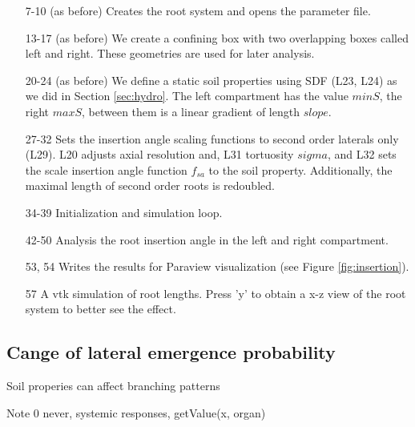 \begin{itemize}

\item[7-10] (as before) Creates the root system and opens the parameter file.

\item[13-17](as before) We create a confining box with two overlapping boxes called left and right. These geometries are used for later analysis.

\item[20-24] (as before) We define a static soil properties using SDF (L23, L24) as we did in Section \ref{sec:hydro}. 
The left compartment has the value $minS$, the right $maxS$, between them is a linear gradient of length $slope$.

\item[27-32] Sets the insertion angle scaling functions to second order laterals only (L29). L20 adjusts axial resolution and, L31 tortuosity $sigma$, and L32 sets the scale insertion angle function $f_{sa}$ to the soil property. Additionally, the maximal length of second order roots is redoubled. 

\item[34-39] Initialization and simulation loop.

\item[42-50] Analysis the root insertion angle in the left and right compartment. 

\item[53, 54] Writes the results for Paraview visualization (see Figure \ref{fig:insertion}).

\item[57] A vtk simulation of root lengths. Press 'y' to obtain a x-z view of the root system to better see the effect. 

\end{itemize}




\subsection{Cange of lateral emergence probability} \label{sec:branching}

Soil properies can affect branching patterns




Note 0 never, systemic responses, getValue(x, organ) 


